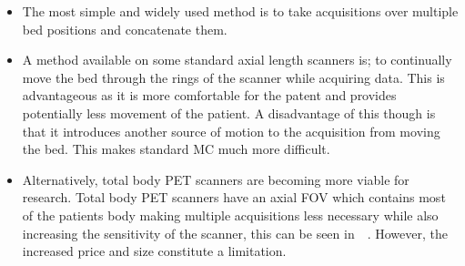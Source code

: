                 \begin{itemize}
                    \item The most simple and widely used method is to take acquisitions over multiple bed positions and concatenate them.
                    
                    \item A method available on some  standard axial length scanners is; to continually move the bed through the rings of the scanner while acquiring data. This is advantageous as it is more comfortable for the patent and provides potentially less movement of the patient. %
                    A disadvantage of this though is that it introduces another source of motion to the acquisition from moving the bed. This makes standard \gls{MC} much more difficult.
                    
                    \item Alternatively, total body \gls{PET} scanners are becoming more viable for research. %
                    Total body \gls{PET} scanners have an axial \gls{FOV} which contains most of the patients body making multiple acquisitions less necessary while also increasing the sensitivity of the scanner, this can be seen in~~. However, the increased price and size constitute a limitation.
                \end{itemize}
            
